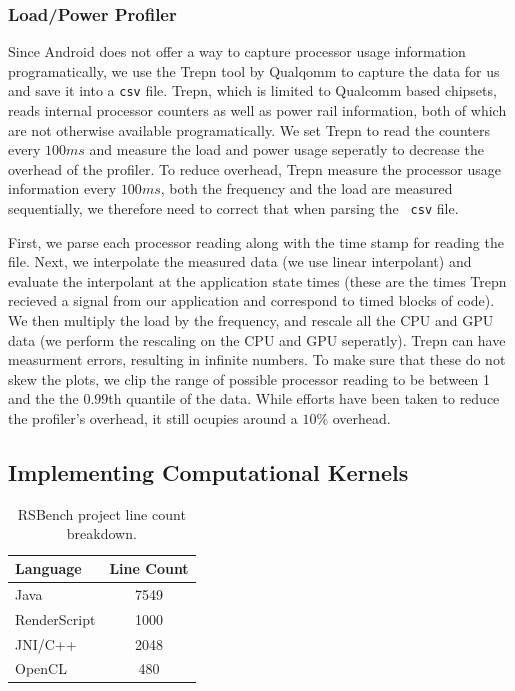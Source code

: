 \subsubsection{Load/Power Profiler}

Since Android does not offer a way to capture processor usage information
programatically, we use the Trepn tool by Qualqomm to capture the data for us
and save it into a {\tt csv} file.   Trepn, which is limited to Qualcomm based
chipsets, reads internal processor counters as well as power rail information,
both of which are not otherwise available programatically.  We set Trepn to read
the counters every $100ms$ and measure the load and power usage seperatly to
decrease the overhead of the profiler.  To reduce overhead, Trepn measure the
processor usage information every $100ms$, both the frequency and the load are
measured sequentially, we therefore need to correct that when parsing the {\tt
csv} file.

First, we parse each processor reading along with the time stamp for reading the
file.  Next, we interpolate the measured data (we use linear interpolant) and
evaluate the interpolant at the application state times (these are the times
Trepn recieved a signal from our application and correspond to timed blocks of
code).  We then multiply the load by the frequency, and rescale all the CPU and
GPU data (we perform the rescaling on the CPU and GPU seperatly).  Trepn can
have measurment errors, resulting in infinite numbers.  To make sure that these
do not skew the plots, we clip the range of possible processor reading to be
between 1 and the the $0.99$th quantile of the data.  While efforts have
been taken to reduce the profiler's overhead, it still ocupies around a
$10\%$ overhead.


\subsection{Implementing Computational Kernels}
\label{sec:imple_RS}

\begin{table}[tp]\small
\centering
\begin{tabular}{ | l | c |}
    \hline 
    Language      & Line Count \\ \hline
    Java          & 7549       \\ \hline
    RenderScript  & 1000       \\ \hline
    JNI/C++       & 2048       \\ \hline
    OpenCL        & 480        \\ \hline
\end{tabular}
\caption{RSBench project line count breakdown.}
\label{table:breakdown}
\end{table}

